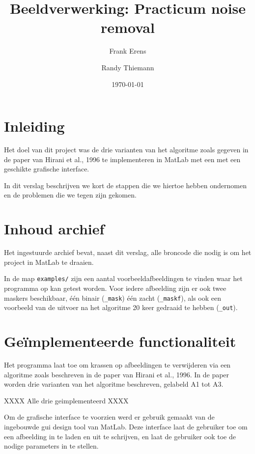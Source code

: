 \documentclass[a4paper,12pt]{article}
\begin{document}
\title{Beeldverwerking: Practicum noise removal}
\author{Frank Erens \and Randy Thiemann}
\date{\isodate\today}
\maketitle

\section{Inleiding}

Het doel van dit project was de drie varianten van het algoritme zoals gegeven
in de paper van Hirani et al., 1996 te implementeren in MatLab met een
met een geschikte grafische interface.

In dit verslag beschrijven we kort de stappen die we hiertoe hebben ondernomen
en de problemen die we tegen zijn gekomen.

\section{Inhoud archief}

Het ingestuurde archief bevat, naast dit verslag, alle broncode die nodig is om
het project in MatLab te draaien. 

In de map \texttt{examples/} zijn een aantal voorbeeldafbeeldingen te vinden
waar het programma op kan getest worden. Voor iedere afbeelding zijn er ook
twee maskers beschikbaar, \'e\'en binair (\texttt{\_mask}) \'e\'en zacht 
(\texttt{\_maskf}), als ook een voorbeeld van de uitvoer na het algoritme 20
keer gedraaid te hebben (\texttt{\_out}).

\section{Ge\"implementeerde functionaliteit}

Het programma laat toe om krassen op afbeeldingen te verwijderen via een
algoritme zoals beschreven in de paper van Hirani et al., 1996. In de paper
worden drie varianten van het algoritme beschreven, gelabeld A1 tot A3. 

\todo{}
XXXX Alle drie geimplementeerd XXXX

Om de grafische interface te voorzien werd er gebruik gemaakt van de ingebouwde
gui design tool van MatLab. Deze interface laat de gebruiker toe om een
afbeelding in te laden en uit te schrijven, en laat de gebruiker ook toe de
nodige parameters in te stellen.
\end{document}

